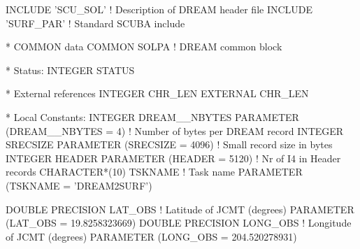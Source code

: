 \documentclass[twoside,11pt,nolof]{starlink}
\begin{document}
\begin{small}
\begin{terminalv}
      INCLUDE 'SCU_SOL'       ! Description of DREAM header file
      INCLUDE 'SURF_PAR'      ! Standard SCUBA include

*  COMMON data
      COMMON SOLPA            ! DREAM common block

*  Status:
      INTEGER STATUS

*  External references
      INTEGER CHR_LEN
      EXTERNAL CHR_LEN

*  Local Constants:
      INTEGER       DREAM__NBYTES
      PARAMETER     (DREAM__NBYTES = 4)  ! Number of bytes per DREAM record
      INTEGER       SRECSIZE
      PARAMETER     (SRECSIZE = 4096)          ! Small record size in bytes
      INTEGER       HEADER
      PARAMETER     (HEADER   = 5120)          ! Nr of I4 in Header records
      CHARACTER*(10) TSKNAME                   ! Task name
      PARAMETER (TSKNAME = 'DREAM2SURF')

      DOUBLE PRECISION LAT_OBS           ! Latitude of JCMT (degrees)
      PARAMETER (LAT_OBS = 19.8258323669)
      DOUBLE PRECISION LONG_OBS          ! Longitude of JCMT (degrees)
      PARAMETER (LONG_OBS = 204.520278931)




\end{terminalv}
\end{small}
\end{document}
